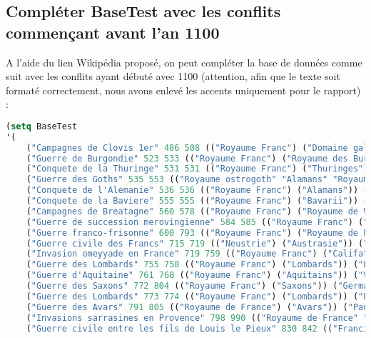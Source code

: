 \documentclass[a4paper, 12pt]{article}
\begin{document}
\subsection{Compléter BaseTest avec les conflits commençant avant l’an 1100}
\vspace{3mm}

A l’aide du lien Wikipédia proposé, on peut compléter la base de données comme suit avec les conflits ayant débuté avec 1100 (attention, afin que le texte soit formaté correctement, nous avons enlevé les accents uniquement pour le rapport) :
\vspace{2mm}

\begin{lstlisting}[language=Lisp]
(setq BaseTest
'(
    ("Campagnes de Clovis 1er" 486 508 (("Royaume Franc") ("Domaine gallo-romain de Soissons" "Royaume alaman" "Royaume des Burgondes" "Royaume wisigoth")) ("Soissons" "Zulpich" "Dijon" "Vouille" "Arles"))
    ("Guerre de Burgondie" 523 533 (("Royaume Franc") ("Royaume des Burgondes")) ("Vezeronce" "Arles"))
    ("Conquete de la Thuringe" 531 531 (("Royaume Franc") ("Thuringes")) ("Thuringe"))
    ("Guerre des Goths" 535 553 (("Royaume ostrogoth" "Alamans" "Royaume Franc" "Royaume wisigoth" "Burgondes") ("Empire byzantin")) ("Peninsule italienne"))
    ("Conquete de l'Alemanie" 536 536 (("Royaume Franc") ("Alamans")) ("Alemanie"))
    ("Conquete de la Baviere" 555 555 (("Royaume Franc") ("Bavarii")) ("Baviere"))
    ("Campagnes de Breatagne" 560 578 (("Royaume Franc") ("Royaume de Vannetais")) ("Vannetais"))
    ("Guerre de succession merovingienne" 584 585 (("Royaume Franc") ("Royaume d'Aquitaine")) ("Comminges"))
    ("Guerre franco-frisonne" 600 793 (("Royaume Franc") ("Royaume de Frise")) ("Pays-Bas" "Allemagne"))
    ("Guerre civile des Francs" 715 719 (("Neustrie") ("Austrasie")) ("Royaume Franc"))
    ("Invasion omeyyade en France" 719 759 (("Royaume Franc") ("Califat omeyyade")) ("Royaume d'Aquitaine" "Septimanie"))
    ("Guerre des Lombards" 755 758 (("Royaume Franc") ("Lombards")) ("Lombardie"))
    ("Guerre d'Aquitaine" 761 768 (("Royaume Franc") ("Aquitains")) ("Vasconie" "Aquitaine"))
    ("Guerre des Saxons" 772 804 (("Royaume Franc") ("Saxons")) ("Germanie"))
    ("Guerre des Lombards" 773 774 (("Royaume Franc") ("Lombards")) ("Lombardie"))
    ("Guerre des Avars" 791 805 (("Royaume de France") ("Avars")) ("Pannonie"))
    ("Invasions sarrasines en Provence" 798 990 (("Royaume de France" "Comte de Provence") ("Sarrasins")) ("Provence"))
    ("Guerre civile entre les fils de Louis le Pieux" 830 842 (("Francie occidentale" "Francie orientale")) ("Fontenoy"))

\end{lstlisting}
\end{document}

